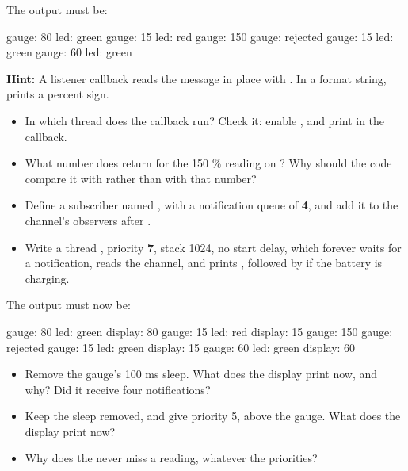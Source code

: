 The output must be:

\begin{console}
gauge: 80 %
  led: green
gauge: 15 %
  led: red
gauge: 150 %
gauge: rejected
gauge: 15 %
  led: green
gauge: 60 %
  led: green
\end{console}

\noindent \textbf{Hint:} A listener callback reads the message in place with
. In a format string, \code{\%\%} prints a percent sign.

\begin{itemize}
  \item In which thread does the  callback run? Check it: enable , and
    print  in the callback.
  \item What number does  return for the 150 \% reading on ? Why
    should the code compare it with  rather than with that number?
\end{itemize}

\label{c4:ex:3.2}

\begin{itemize}
  \item Define a subscriber named , with a notification queue of \textbf{4}, and add it to the
    channel’s observers after .
  \item Write a thread , priority \textbf{7}, stack 1024, no start delay, which forever
    waits for a notification, reads the channel, and prints , followed by
     if the battery is charging.
\end{itemize}

The output must now be:

\begin{console}
gauge: 80 %
  led: green
  display: 80 %
gauge: 15 %
  led: red
  display: 15 %
gauge: 150 %
gauge: rejected
gauge: 15 %
  led: green
  display: 15 %
gauge: 60 %
  led: green
  display: 60 %
\end{console}

\begin{itemize}
  \item Remove the gauge’s 100 ms sleep. What does the display print now, and why? Did it receive four
    notifications?
  \item Keep the sleep removed, and give  priority 5, above the gauge. What does the
    display print now?
  \item Why does the  never miss a reading, whatever the priorities?
\end{itemize}

